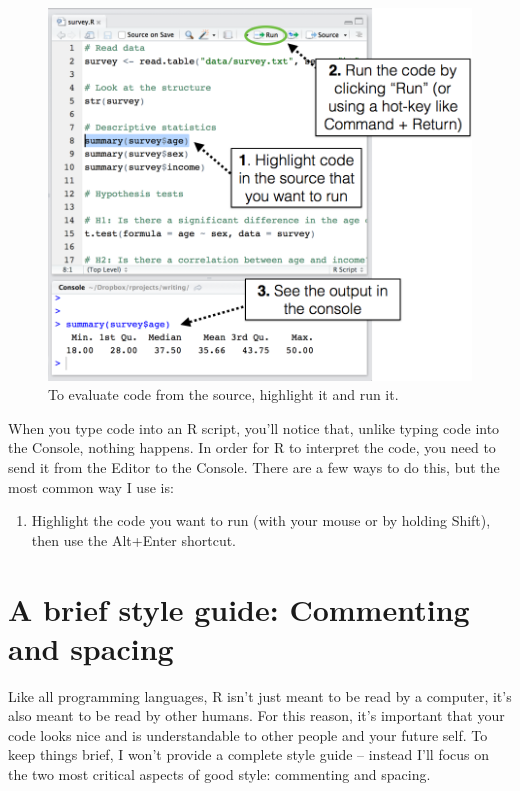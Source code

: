 \documentclass[
]{book}
\providecommand{\tightlist}{%
  \setlength{\itemsep}{0pt}\setlength{\parskip}{0pt}}
\begin{document}
\begin{figure}

{\centering \includegraphics[width=0.75\linewidth]{images/chapter-2/runningcode} 

}

\caption{To evaluate code from the source, highlight it and run it.}\label{fig:runcode}
\end{figure}

When you type code into an R script, you'll notice that, unlike typing code into the Console, nothing happens. In order for R to interpret the code, you need to send it from the Editor to the Console. There are a few ways to do this, but the most common way I use is:

\begin{enumerate}
\def\labelenumi{\arabic{enumi}.}
\tightlist
\item
  Highlight the code you want to run (with your mouse or by holding Shift), then use the Alt+Enter shortcut.
\end{enumerate}

\hypertarget{a-brief-style-guide-commenting-and-spacing}{%
\section{A brief style guide: Commenting and spacing}\label{a-brief-style-guide-commenting-and-spacing}}

Like all programming languages, R isn't just meant to be read by a computer, it's also meant to be read by other humans. For this reason, it's important that your code looks nice and is understandable to other people and your future self. To keep things brief, I won't provide a complete style guide -- instead I'll focus on the two most critical aspects of good style: commenting and spacing.
\end{document}
